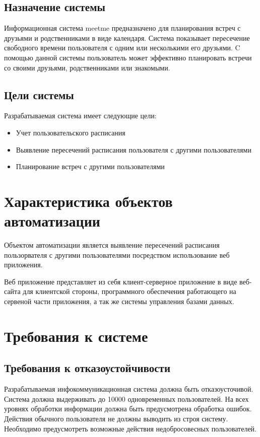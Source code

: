\documentclass[14pt]{extreport}
\begin{document}
    \subsection{Назначение системы}
        Информационная система meet\textunderscore me предназначено для планирования встреч с друзьями и родственниками в виде календаря. 
        Система показывает пересечение свободного времени пользователя с одним или несколькими его друзьями.
        C помощью данной системы пользователь может эффективно планировать встречи со своими друзьями, родственниками или знакомыми.

    \subsection{Цели системы}
        Разрабатываемая  система имеет следующие цели:
        \begin{itemize}
            \item Учет пользовательского расписания
            \item Выявление пересечений расписания пользователя с другими пользователями 
            \item Планирование встреч с другими пользователями 
        \end{itemize}

\section{Характеристика объектов автоматизации}
        Объектом автоматизации является выявление пересечений расписания пользорвателя с другими пользователями посредством использование веб приложения.
        
        Веб приложение представляет из себя клиент-серверное приложение в виде веб-сайта для клиентской стороны, программного обеспечения работающего на сервеной части приложения, а так же системы управления базами данных.

\section{Требования к системе}

        \subsection{Требования к отказоустойчивости}
            Разрабатываемая инфокоммуникационная система должна быть отказоусточивой. Система должна выдерживать до 10000 одновременных пользователей. На всех уровнях обработки информации должна быть предусмотрена обработка ошибок. Действия обычного пользователя не должны выводить из строя систему. Необходимо предусмотреть возможные действия недобросовесных пользователей. 
\end{document}
